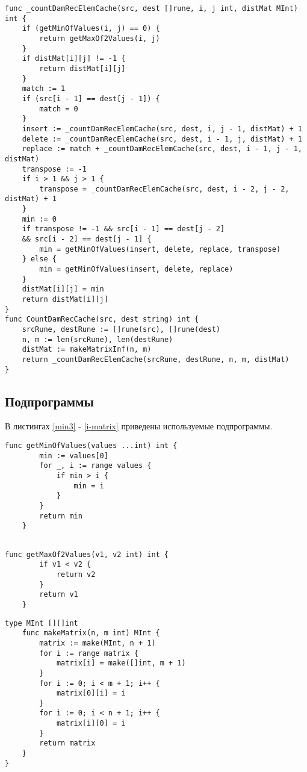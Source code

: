\begin{lstlisting}[label=damer-lev-rec,caption=Программный код нахождения расстояния Дамерау\,--\,Левенштейна рекурсивно с кэшем]	
func _countDamRecElemCache(src, dest []rune, i, j int, distMat MInt) int {
	if (getMinOfValues(i, j) == 0) {
		return getMaxOf2Values(i, j)
	}
	if distMat[i][j] != -1 {
		return distMat[i][j]
	}
	match := 1
	if (src[i - 1] == dest[j - 1]) {
		match = 0
	}
	insert := _countDamRecElemCache(src, dest, i, j - 1, distMat) + 1
	delete := _countDamRecElemCache(src, dest, i - 1, j, distMat) + 1
	replace := match + _countDamRecElemCache(src, dest, i - 1, j - 1, distMat)
	transpose := -1
	if i > 1 && j > 1 {
		transpose = _countDamRecElemCache(src, dest, i - 2, j - 2, distMat) + 1
	}
	min := 0
	if transpose != -1 && src[i - 1] == dest[j - 2] 
	&& src[i - 2] == dest[j - 1] {
		min = getMinOfValues(insert, delete, replace, transpose)
	} else {
		min = getMinOfValues(insert, delete, replace)
	}
	distMat[i][j] = min
	return distMat[i][j]
}
func CountDamRecCache(src, dest string) int {
	srcRune, destRune := []rune(src), []rune(dest)
	n, m := len(srcRune), len(destRune)
	distMat := makeMatrixInf(n, m)
	return _countDamRecElemCache(srcRune, destRune, n, m, distMat)
}
\end{lstlisting}

\subsection{Подпрограммы}
В листингах \ref{min3} - \ref{i-matrix} приведены используемые подпрограммы.
\begin{lstlisting}[label=min3,caption=Функция нахождения минимума из N целых чисел]
	func getMinOfValues(values ...int) int {
		min := values[0]
		for _, i := range values {
			if min > i {
				min = i
			}
		}
		return min
	}
	
\end{lstlisting}

\begin{lstlisting}[label=max2,caption=Функция нахождения максимума из двух целых чисел]
	func getMaxOf2Values(v1, v2 int) int {
		if v1 < v2 {
			return v2
		}
		return v1
	}
\end{lstlisting}


\begin{lstlisting}[label=i-matrix,caption=Определение типа целочисленной матрицы; его инициализация]
	type MInt [][]int
	func makeMatrix(n, m int) MInt {
		matrix := make(MInt, n + 1)
		for i := range matrix {
			matrix[i] = make([]int, m + 1)
		}
		for i := 0; i < m + 1; i++ {
			matrix[0][i] = i
		}
		for i := 0; i < n + 1; i++ {
			matrix[i][0] = i
		}
		return matrix
	}	
}

\end{lstlisting}

